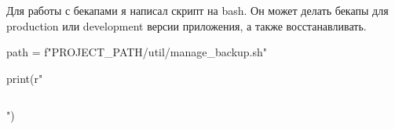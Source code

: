Для работы с бекапами я написал скрипт на bash. Он может делать бекапы для production или development версии приложения, а также восстанавливать.

\begin{pycode}
path = f"{PROJECT_PATH}/util/manage_backup.sh"

print(r"\inputminted{bash}{" + path + r"}")
\end{pycode}

\clearpage